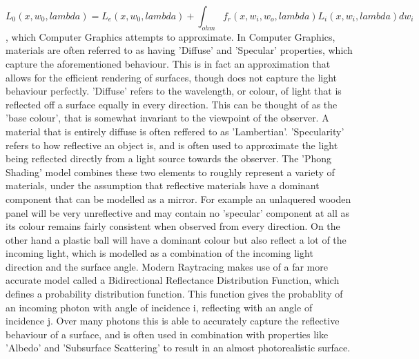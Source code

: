 \documentclass[ %
                    author={Gavin Parker},
                supervisor={Dr. Neill Campbell},
                    degree={MEng},
                     title={Deep Siamese Networks for Illumination Estimation from Stereo Images},
                  subtitle={},
                      type={research},
                      year={2018} ]{dissertation}
\begin{document}
\[L_0(x, w_0, lambda) = L_e(x, w_0, lambda) + \int_{ohm}{f_r(x, w_i, w_o,lambda)L_i(x, w_i, lambda)dw_i}\],
which Computer Graphics attempts to approximate.
\newline
In Computer Graphics, materials are often referred to as having 'Diffuse' and 'Specular' properties, which capture the aforementioned behaviour. This is in fact an approximation that allows for the efficient rendering of surfaces, though does not capture the light behaviour perfectly. 'Diffuse' refers to the wavelength, or colour, of light that is reflected off a surface equally in every direction. This can be thought of as the 'base colour', that is somewhat invariant to the viewpoint of the observer. A material that is entirely diffuse is often reffered to as 'Lambertian'. 'Specularity' refers to how reflective an object is, and is often used to approximate the light being reflected directly from a light source towards the observer. The 'Phong Shading' model combines these two elements to roughly represent a variety of materials, under the assumption that reflective materials have a dominant component that can be modelled as a mirror. For example an unlaquered wooden panel will be very unreflective and may contain no 'specular' component at all as its colour remains fairly consistent when observed from every direction. On the other hand a plastic ball will have a dominant colour but also reflect a lot of the incoming light, which is modelled as a combination of the incoming light direction and the surface angle. Modern Raytracing makes use of a far more accurate model called a Bidirectional Reflectance Distribution Function, which defines a probability distribution function. This function gives the probablity of an incoming photon with angle of incidence i, reflecting with an angle of incidence j. Over many photons this is able to accurately capture the reflective behaviour of a surface, and is often used in combination with properties like 'Albedo' and 'Subsurface Scattering' to result in an almost photorealistic surface.
\newline
\end{document}

